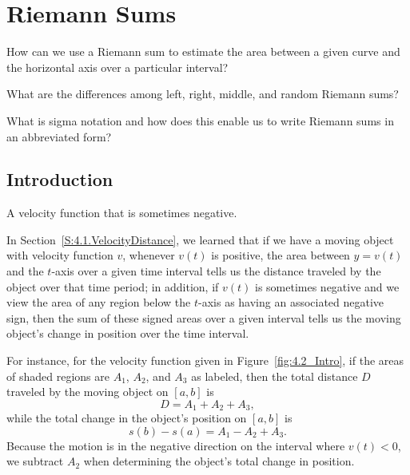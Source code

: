 \section{Riemann Sums} \label{S:4.2.Riemann}

\begin{goals}
\item How can we use a Riemann sum to estimate the area between a given curve and the horizontal axis over a particular interval?

\item What are the differences among left, right, middle, and random Riemann sums?

\item What is sigma notation and how does this enable us to write Riemann sums in an abbreviated form?
\end{goals}

\subsection*{Introduction}

\begin{marginfigure}[3in] %
\caption{A velocity function that is sometimes negative.} \label{fig:4.2_Intro}
\end{marginfigure}

In Section~\ref{S:4.1.VelocityDistance}, we learned that if we have a moving object with velocity function $v$, whenever $v(t)$ is positive, the area between $y = v(t)$ and the $t$-axis over a given time interval tells us the distance traveled by the object over that time period; in addition, if $v(t)$ is sometimes negative and we view the area of any region below the $t$-axis as having an associated negative sign, then the sum of these signed areas over a given interval tells us the moving object's change in position over the time interval.

For instance, for the velocity function given in Figure~\ref{fig:4.2_Intro}, if the areas of shaded regions are $A_1$, $A_2$, and $A_3$ as labeled, then the total distance $D$ traveled by the moving object on $[a,b]$ is 
\[ D = A_1 + A_2 + A_3, \]
while the total change in the object's position on $[a,b]$ is 
\[ s(b) - s(a) = A_1 - A_2 + A_3. \]
Because the motion is in the negative direction on the interval where $v(t) < 0$, we subtract $A_2$ when determining the object's total change in position.

